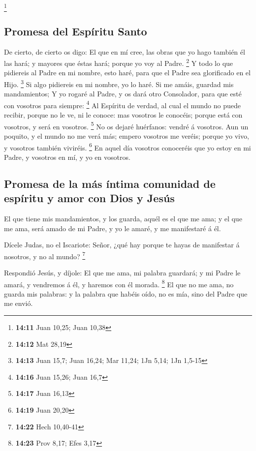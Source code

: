 \footnote{\textbf{14:11} Juan 10,25; Juan 10,38}

\hypertarget{promesa-del-espuxedritu-santo}{%
\subsection{Promesa del Espíritu
Santo}\label{promesa-del-espuxedritu-santo}}

 De cierto, de cierto os digo: El que en mí cree, las
obras que yo hago también él las hará; y mayores que éstas hará; porque
yo voy al Padre. \footnote{\textbf{14:12} Mat 28,19}  Y
todo lo que pidiereis al Padre en mi nombre, esto haré, para que el
Padre sea glorificado en el Hijo. \footnote{\textbf{14:13} Juan 15,7;
  Juan 16,24; Mar 11,24; 1Jn 5,14; 1Jn 1,5-15}  Si algo
pidiereis en mi nombre, yo lo haré.  Si me amáis, guardad
mis mandamientos;  Y yo rogaré al Padre, y os dará otro
Consolador, para que esté con vosotros para siempre: \footnote{\textbf{14:16}
  Juan 15,26; Juan 16,7}  Al Espíritu de verdad, al cual
el mundo no puede recibir, porque no le ve, ni le conoce: mas vosotros
le conocéis; porque está con vosotros, y será en vosotros. \footnote{\textbf{14:17}
  Juan 16,13}  No os dejaré huérfanos: vendré á vosotros.
 Aun un poquito, y el mundo no me verá más; empero
vosotros me veréis; porque yo vivo, y vosotros también viviréis.
\footnote{\textbf{14:19} Juan 20,20}  En aquel día
vosotros conoceréis que yo estoy en mi Padre, y vosotros en mí, y yo en
vosotros.

\hypertarget{promesa-de-la-muxe1s-uxedntima-comunidad-de-espuxedritu-y-amor-con-dios-y-jesuxfas}{%
\subsection{Promesa de la más íntima comunidad de espíritu y amor con
Dios y
Jesús}\label{promesa-de-la-muxe1s-uxedntima-comunidad-de-espuxedritu-y-amor-con-dios-y-jesuxfas}}

 El que tiene mis mandamientos, y los guarda, aquél es el
que me ama; y el que me ama, será amado de mi Padre, y yo le amaré, y me
manifestaré á él.

 Dícele Judas, no el Iscariote: Señor, ¿qué hay porque te
hayas de manifestar á nosotros, y no al mundo? \footnote{\textbf{14:22}
  Hech 10,40-41}

 Respondió Jesús, y díjole: El que me ama, mi palabra
guardará; y mi Padre le amará, y vendremos á él, y haremos con él
morada. \footnote{\textbf{14:23} Prov 8,17; Efes 3,17} 
El que no me ama, no guarda mis palabras: y la palabra que habéis oído,
no es mía, sino del Padre que me envió.

